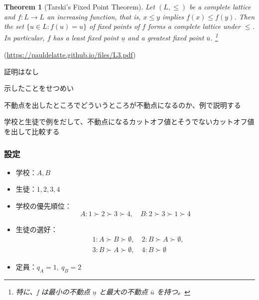 \documentclass[12pt, a4paper]{article}
\theoremstyle{definition}
\theoremstyle{remark}
\theoremstyle{plain}
\begin{document}





\begin{tcolorbox}[
  enhanced,
  colframe = black,
  colback = white,
  title = Tarski's Fixed Point Theoremについて,
  fonttitle = \bfseries,
  breakable = true,
  coltitle = black,
  attach boxed title to top left = {xshift=5mm, yshift=-3mm}, 
  boxed title style = {colframe = black, colback = white},
  top = 4mm]
  \newtheorem*{theoremTemp}{Theorem}
  \begin{theoremTemp}[Tarski's Fixed Point Theorem]
    Let $(L, \leq)$ be a complete lattice and $f: L \to L$ an increasing function, that is, $x \leq y$ implies $f(x) \leq f(y)$. Then the set $\{ u \in L : f(u) = u \}$ of fixed points of $f$ forms a complete lattice under $\leq$. In particular, $f$ has a least fixed point $\underline{u}$ and a greatest fixed point $\overline{u}$.  \footnote{特に、f は最小の不動点 $\underline{u}$ と最大の不動点 $\bar{u}$ を持つ。}
    
  \end{theoremTemp}
  (\url{https://pauldelatte.github.io/files/L3.pdf})

\end{tcolorbox}

証明はなし

示したことをせつめい

不動点を出したところでどういうところが不動点になるのか、例で説明する

学校と生徒で例をだして、不動点になるカットオフ値とそうでないカットオフ値を出して比較する

\subsubsection*{設定}
\begin{itemize}
  \item 学校：$A,B$
  \item 生徒：$1,2,3,4$
  \item 学校の優先順位：
  \[
    A: 1 \succ 2 \succ 3 \succ 4, \quad
    B: 2 \succ 3 \succ 1 \succ 4
  \]
  \item 生徒の選好：
  \[
    \begin{aligned}
    &1: A \succ B \succ \emptyset, \quad
    2: B \succ A \succ \emptyset, \\
    &3: B \succ A \succ \emptyset, \quad
    4: B \succ \emptyset
    \end{aligned}
  \]
  \item 定員：$q_A=1,\ q_B=2$
\end{itemize}
\end{document}
